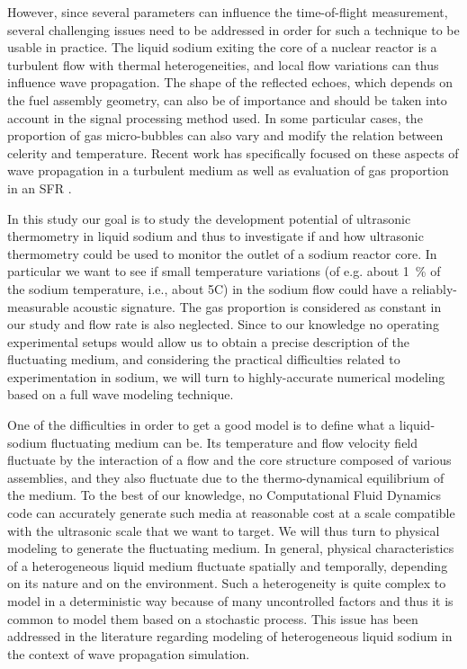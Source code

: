         However, since several parameters can influence the time-of-flight measurement, several challenging issues need to be addressed in order for such a
technique to be usable in practice. The liquid sodium exiting the core of a nuclear reactor is a turbulent flow with thermal heterogeneities, and local flow
variations can thus influence wave propagation. The shape of the reflected echoes, which depends on the fuel assembly geometry, can also be of importance and
should be taken into account in the signal processing method used. In some particular cases, the proportion of gas micro-bubbles can also vary and modify the
relation between celerity and temperature. Recent work has specifically focused on these aspects of wave propagation in a turbulent medium
\parencite{Massacret2014Modellingofultrasonic} as well as evaluation of gas proportion in an SFR \parencite{Cavaro2011Microbubblecloudcharacterization}.

        In this study our goal is to study the development potential of ultrasonic thermometry in liquid sodium and thus to investigate if and how ultrasonic
thermometry could be used to monitor the outlet of a sodium reactor core. In particular we want to see if small temperature variations (of e.g. about
\SI{1}{\percent} of the sodium temperature, i.e., about 5\textdegree{}C) in the sodium flow could have a reliably-measurable acoustic signature. The gas
proportion is considered as constant in our study and flow rate is also neglected. Since to our knowledge no operating experimental setups would allow us to
obtain a precise description of the fluctuating medium, and considering the practical difficulties related to experimentation in sodium, we will turn to
highly-accurate numerical modeling based on a full wave modeling technique.

        One of the difficulties in order to get a good model is to define what a liquid-sodium fluctuating medium can be. Its temperature and flow velocity
field fluctuate by the interaction of a flow and the core structure composed of various assemblies, and they also fluctuate due to the thermo-dynamical
equilibrium of the medium.
To the best of our knowledge, no Computational Fluid Dynamics code can accurately generate such media at reasonable cost at a scale
compatible with the ultrasonic scale that we want to target. We will thus turn to physical modeling to generate the fluctuating medium.
In general, physical characteristics of a heterogeneous liquid medium fluctuate spatially and temporally, depending on its nature and on the environment.
Such a heterogeneity is quite complex to model in a deterministic way because of many uncontrolled factors and thus it is common to model them based on a stochastic process.
This issue has been addressed in the literature regarding modeling of heterogeneous liquid sodium in the context of wave propagation simulation.

